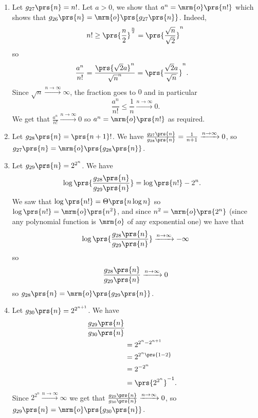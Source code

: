 \documentclass[oneside]{scrbook}
\theoremstyle{definition}
\begin{document}
\begin{problem}
\begin{enumerate}[label=\alph*.]
\begin{enumerate}[label=\arabic*.]
\item Let $g_{27}\prs{n} = n!$. Let $a > 0$, we show that $a^n = \mrm{o}\prs{n!}$ which shows that $g_{26}\prs{n} = \mrm{o}\prs{g_{27}\prs{n}}$.
Indeed,
\begin{align*}
n! \geq \prs{\frac{n}{2}}^{\frac{n}{2}} = \prs{\frac{\sqrt{n}}{\sqrt{2}}}^n
\end{align*}
so
\begin{align*}
\frac{a^n}{n!} &= \frac{\prs{\sqrt{2}a}^n}{\sqrt{n}^n} = \prs{\frac{\sqrt{2}a}{\sqrt{n}}}^n \text{.}
\end{align*}
Since $\sqrt{n} \xrightarrow{n\to\infty} \infty$, the fraction goes to $0$ and in particular
\[\frac{a^n}{n!} \leq \frac{1}{n} \xrightarrow{n\to\infty} 0 \text{.}\]
We get that $\frac{a^n}{n!} \xrightarrow{n\to\infty} 0$ so $a^n = \mrm{o}\prs{n!}$ as required.

\item Let $g_{28}\prs{n} = \prs{n+1}!$. We have $\frac{g_{27}\prs{n}}{g_{28}\prs{n}} = \frac{1}{n+1} \xrightarrow{n\to\infty} 0$, so $g_{27}\prs{n} = \mrm{o}\prs{g_{28}\prs{n}}$.

\item Let $g_{29}\prs{n} = 2^{2^n}$. We have
\begin{align*}
\log\prs{\frac{g_{28}\prs{n}}{g_{29}\prs{n}}} &= \log\prs{n!} - 2^n \text{.}
\end{align*}
We saw that $\log\prs{n!} = \Theta\prs{n \log n}$ so $\log\prs{n!} = \mrm{o}\prs{n^2}$, and since $n^2 = \mrm{o}\prs{2^n}$ (since any polynomial function is $\mrm{o}$ of any exponential one) we have that
\begin{align*}
\log\prs{\frac{g_{28}\prs{n}}{g_{29}\prs{n}}} \xrightarrow{n\to\infty} - \infty
\end{align*}
so
\begin{align*}
\frac{g_{28}\prs{n}}{g_{29}\prs{n}} \xrightarrow{n\to\infty} 0
\end{align*}
so
$g_{28}\prs{n} = \mrm{o}\prs{g_{29}\prs{n}}$.

\item Let $g_{30}\prs{n} = 2^{2^{n+1}}$. We have
\begin{align*}
\frac{g_{29}\prs{n}}{g_{30}\prs{n}}
\\&=
2^{2^n - 2^{n+1}}
\\&=
2^{2^n\prs{1 - 2}}
\\&=
2^{-2^n}
\\&=
\prs{2^{2^n}}^{-1} \text{.}
\end{align*}
Since $2^{2^n} \xrightarrow{n\to\infty} \infty$ we get that $\frac{g_{29}\prs{n}}{g_{30}\prs{n}} \xrightarrow{n\to\infty} 0$, so $g_{29}\prs{n} = \mrm{o}\prs{g_{30}\prs{n}}$.
\end{enumerate}


\end{enumerate}
\end{problem}
\end{document}
